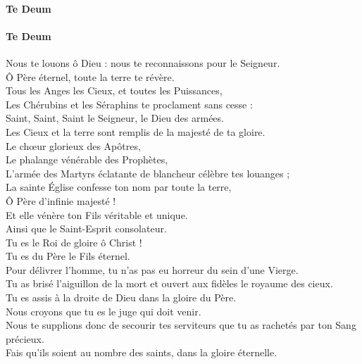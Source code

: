 \documentclass[twoside]{article}
\begin{document}
\begin{paracol}[1]{2}
\paragraph{Te Deum}
	

\switchcolumn

\paragraph{Te Deum}
\vfill
Nous te louons ô Dieu : nous te reconnaissons pour le Seigneur.\\
Ô Père éternel, toute la terre te révère.\\
Tous les Anges les Cieux, et toutes les Puissances,\\
Les Chérubins et les Séraphins te proclament sans cesse :\\

Saint, Saint, Saint le Seigneur, le Dieu des armées.\\
Les Cieux et la terre sont remplis de la majesté de ta gloire.\\

Le chœur glorieux des Apôtres,\\
\vfill
\newpage
\null\vfill
Le phalange vénérable des Prophètes,\\
L'armée des Martyrs éclatante de blancheur célèbre tes louanges ;\\

La sainte Église confesse ton nom par toute la terre,\\
Ô Père d'infinie majesté !\\
Et elle vénère ton Fils véritable et unique.\\
Ainsi que le Saint-Esprit consolateur.\\
Tu es le Roi de gloire ô Christ !\\
Tu es du Père le Fils éternel.\\

Pour délivrer l'homme, tu n'as pas eu horreur du sein d'une Vierge.\\

Tu as brisé l'aiguillon de la mort et ouvert aux fidèles le royaume des cieux.\\
Tu es assis à la droite de Dieu dans la gloire du Père.\\
Nous croyons que tu es le juge qui doit venir.\\

\vfill
\newpage
\null\vfill
Nous te supplions donc de secourir tes serviteurs que tu as rachetés par ton Sang précieux.\\
Fais qu'ils soient au nombre des saints, dans la gloire éternelle.\\


\end{paracol}
\end{document}
